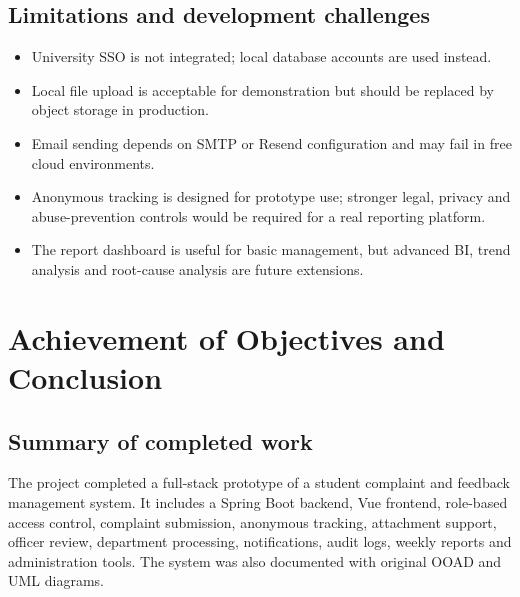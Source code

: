 \documentclass[11pt,a4paper]{article}
\begin{document}
\subsection{Limitations and development challenges}
\begin{itemize}
  \item University SSO is not integrated; local database accounts are used instead.
  \item Local file upload is acceptable for demonstration but should be replaced by object storage in production.
  \item Email sending depends on SMTP or Resend configuration and may fail in free cloud environments.
  \item Anonymous tracking is designed for prototype use; stronger legal, privacy and abuse-prevention controls would be required for a real reporting platform.
  \item The report dashboard is useful for basic management, but advanced BI, trend analysis and root-cause analysis are future extensions.
\end{itemize}

\section{Achievement of Objectives and Conclusion}

\subsection{Summary of completed work}
The project completed a full-stack prototype of a student complaint and feedback management system. It includes a Spring Boot backend, Vue frontend, role-based access control, complaint submission, anonymous tracking, attachment support, officer review, department processing, notifications, audit logs, weekly reports and administration tools. The system was also documented with original OOAD and UML diagrams.
\end{document}
